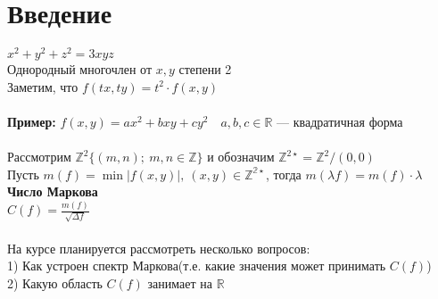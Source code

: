 \newpage
\section{Введение}
	$x^2 + y^2 + z^2 = 3xyz$\\
	Однородный многочлен от $x, y$ степени 2\\
	Заметим, что $f(tx,ty) = t^2 \cdot f(x,y)$\\
	\\
	\textbf{Пример:} $f(x,y) = ax^2 + bxy + cy^2 \quad a,b,c \in \mathbb{R}$ --- квадратичная форма\\
	\\
	Рассмотрим $\mathbb{Z}^2 \{ (m,n); \: m,n \in \mathbb{Z}\}$ и обозначим $\mathbb{Z}^{2 \star} = \mathbb{Z}^2 / (0,0)$\\
	Пусть $m(f) = \min{|f(x,y)|, \: (x,y) \in \mathbb{Z^{2\star}}}$, тогда $m(\lambda f) = m(f) \cdot \lambda$\\
	\textbf{Число Маркова}\\
	$C(f) = \frac{m(f)}{\sqrt{\Delta f}}$\\
	\\
	На курсе планируется рассмотреть несколько вопросов:\\
	1) Как устроен спектр Маркова(т.е. какие значения может принимать $C(f)$)\\
	2) Какую область $C(f)$ занимает на $\mathbb{R}$\\
	
